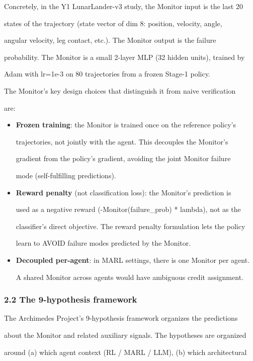 \documentclass[
]{article}
\begin{document}
Concretely, in the Y1 LunarLander-v3 study, the Monitor input is the
last 20

states of the trajectory (state vector of dim 8: position, velocity,
angle,

angular velocity, leg contact, etc.). The Monitor output is the failure

probability. The Monitor is a small 2-layer MLP (32 hidden units),
trained by

Adam with lr=1e-3 on 80 trajectories from a frozen Stage-1 policy.

The Monitor's key design choices that distinguish it from naive
verification

are:

\begin{itemize}
\item
  \textbf{Frozen training}: the Monitor is trained once on the reference
  policy's

  trajectories, not jointly with the agent. This decouples the Monitor's

  gradient from the policy's gradient, avoiding the joint Monitor
  failure

  mode (self-fulfilling predictions).
\item
  \textbf{Reward penalty} (not classification loss): the Monitor's
  prediction is

  used as a negative reward (-Monitor(failure\_prob) * lambda), not as
  the

  classifier's direct objective. The reward penalty formulation lets the
  policy

  learn to AVOID failure modes predicted by the Monitor.
\item
  \textbf{Decoupled per-agent}: in MARL settings, there is one Monitor
  per agent.

  A shared Monitor across agents would have ambiguous credit assignment.
\end{itemize}

\subsubsection{2.2 The 9-hypothesis
framework}\label{the-9-hypothesis-framework}

The Archimedes Project's 9-hypothesis framework organizes the
predictions

about the Monitor and related auxiliary signals. The hypotheses are
organized

around (a) which agent context (RL / MARL / LLM), (b) which
architectural
\end{document}
